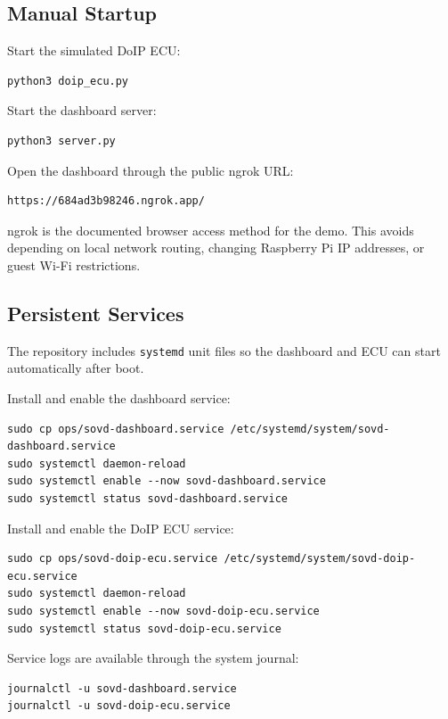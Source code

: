 \documentclass[a4paper,10pt,titlepage,oneside]{article}
\begin{document}
\subsection{Manual Startup}

Start the simulated DoIP ECU:

\begin{lstlisting}
python3 doip_ecu.py
\end{lstlisting}

Start the dashboard server:

\begin{lstlisting}
python3 server.py
\end{lstlisting}

Open the dashboard through the public ngrok URL:

\begin{lstlisting}
https://684ad3b98246.ngrok.app/
\end{lstlisting}

ngrok is the documented browser access method for the demo. This avoids
depending on local network routing, changing Raspberry Pi IP addresses, or guest
Wi-Fi restrictions.

\subsection{Persistent Services}

The repository includes \texttt{systemd} unit files so the dashboard and ECU can
start automatically after boot.

Install and enable the dashboard service:

\begin{lstlisting}
sudo cp ops/sovd-dashboard.service /etc/systemd/system/sovd-dashboard.service
sudo systemctl daemon-reload
sudo systemctl enable --now sovd-dashboard.service
sudo systemctl status sovd-dashboard.service
\end{lstlisting}

Install and enable the DoIP ECU service:

\begin{lstlisting}
sudo cp ops/sovd-doip-ecu.service /etc/systemd/system/sovd-doip-ecu.service
sudo systemctl daemon-reload
sudo systemctl enable --now sovd-doip-ecu.service
sudo systemctl status sovd-doip-ecu.service
\end{lstlisting}

Service logs are available through the system journal:

\begin{lstlisting}
journalctl -u sovd-dashboard.service
journalctl -u sovd-doip-ecu.service
\end{lstlisting}
\end{document}
